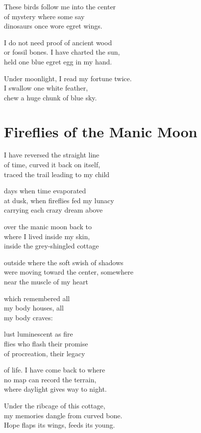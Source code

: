 \documentclass[twoside,10pt]{book}
\begin{document}
These birds follow me into the center\\
of mystery where some say\\
dinosaurs once wore egret wings.

I do not need proof of ancient wood\\
or fossil bones. I have charted the sun,\\
held one blue egret egg in my hand.

Under moonlight, I read my fortune twice.\\
I swallow one white feather,\\
chew a huge chunk of blue sky.


\clearpage
\section{Fireflies of the Manic Moon}

I have reversed the straight line\\
of time, curved it back on itself,\\
traced the trail leading to my child

days when time evaporated\\
at dusk, when fireflies fed my lunacy\\
carrying each crazy dream above

over the manic moon back to\\
where I lived inside my skin,\\
inside the grey-shingled cottage

outside where the soft swish of shadows\\
were moving toward the center, somewhere\\
near the muscle of my heart

which remembered all\\
my body houses, all\\
my body craves:

lust luminescent as fire\\
flies who flash their promise\\
of procreation, their legacy

of life. I have come back to where\\
no map can record the terrain,\\
where daylight gives way to night.

Under the ribcage of this cottage,\\
my memories dangle from curved bone.\\
Hope flaps its wings, feeds its young.
\end{document}
